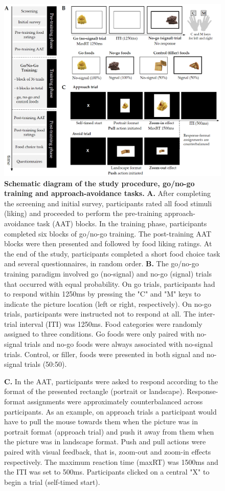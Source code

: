 \documentclass[man,floatsintext]{apa6}
\begin{document}
\begin{figure} [!htb]
\centering
\includegraphics[width=\linewidth]{figures/Figure1.png}
\caption{\textbf{Schematic diagram of the study procedure, go/no-go training and approach-avoidance tasks.} \textbf{A.} After completing the screening and initial survey, participants rated all food stimuli (liking) and proceeded to perform the pre-training approach-avoidance task (AAT) blocks. In the training phase, participants completed six blocks of go/no-go training. The post-training AAT blocks were then presented and followed by food liking ratings. At the end of the study, participants completed a short food choice task and several questionnaires, in random order. \textbf{B.} The go/no-go training paradigm involved go (no-signal) and no-go (signal) trials that occurred with equal probability. On go trials, participants had to respond within 1250ms by pressing the "C" and "M" keys to indicate the picture location (left or right, respectively). On no-go trials, participants were instructed not to respond at all. The inter-trial interval (ITI) was 1250ms. Food categories were randomly assigned to three conditions. Go foods were only paired with no-signal trials and no-go foods were always associated with no-signal trials. Control, or filler, foods were presented in both signal and no-signal trials (50:50).}
\label{fig:procedure}
\end{figure}
\clearpage
\begin{figure}
    \ContinuedFloat
    \captionsetup{labelformat=empty}
    \caption{\textbf{C.} In the AAT, participants were asked to respond according to the format of the presented rectangle (portrait or landscape). Response-format assignments were approximately counterbalanced across participants. As an example, on approach trials a participant would have to pull the mouse towards them when the picture was in portrait format (approach trial) and push it away from them when the picture was in landscape format. Push and pull actions were paired with visual feedback, that is, zoom-out and zoom-in effects respectively. The maximum reaction time (maxRT) was 1500ms and the ITI was set to 500ms. Participants clicked on a central "X" to begin a trial (self-timed start).}
\end{figure}
\end{document}
